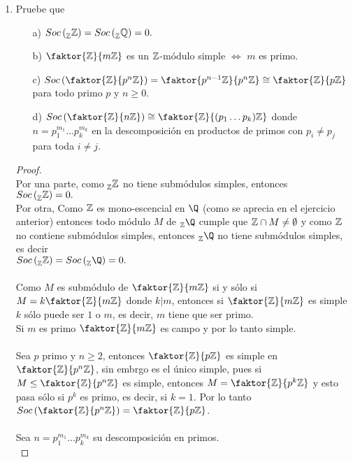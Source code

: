 \documentclass{article}
\begin{document}
\begin{enumerate}[label=\textbf{Ej \arabic*.}]
		\item Pruebe que 
		\begin{itemize}
			\item[a)] $Soc\left(\prescript{}{\mathbb{Z}}{\mathbb{Z}}\right)=Soc\left(\prescript{}{\mathbb{Z}}{\mathbb{Q}}\right)=0.$
			\item[b)] $\faktor{\Z}{m\Z}$ es un $\mathbb{Z}$-módulo simple $\iff$ $m$ es primo.
			\item[c)] $Soc\left(\faktor{\Z}{p^n\Z}\right)=\faktor{p^{n-1}\Z}{p^n\Z}\cong \faktor{\Z}{p\Z}$ para todo primo $p$ y $n\geq 0$.
			\item[d)] $Soc\left(\faktor{\Z}{n\Z}\right)\cong \faktor{\Z}{(p_1\ldots p_k)\Z}$ donde $n=p_1^{m_1}\ldots p_k^{m_k}$ en la descomposición
			en productos de primos con $p_i\neq p_j$ para toda $i\neq j$.
		\end{itemize}
		\begin{proof}\\
		Por una parte, como $\prescript{}{\mathbb{Z}}{\mathbb{Z}}$ no tiene submódulos simples, entonces\\ $Soc\left(\prescript{}{\mathbb{Z}}{\mathbb{Z}}\right)=0.$\\
		Por otra, Como $\mathbb{Z}$ es mono-escencial en $\Q$ (como se aprecia en el ejercicio anterior) entonces todo módulo $M$ de 
		$\prescript{}{\Z}{\Q}$ cumple que $\mathbb{Z}\cap M\neq \emptyset$ y como $\mathbb{Z}$ no contiene submódulos simples, entonces $\prescript{}{\Z}{\Q}$ no tiene
		submódulos simples, es decir \\$Soc\left(\prescript{}{\Z}{\Z}\right)=Soc\left(\prescript{}{\Z}{\Q}\right)=0.$\\
		\\
		Como $M$ es submódulo de  $\faktor{\Z}{m\Z}$ si y sólo si $M=k\faktor{\Z}{m\Z}$ donde $k|m$, entonces si $\faktor{\Z}{m\Z}$ es simple
		$k$ sólo puede ser $1$ o $m$, es decir, $m$ tiene que ser primo.\\
		Si $m$ es primo $\faktor{\Z}{m\Z}$ es campo y por lo tanto simple.\\
		\\
		Sea $p$ primo y $n\geq 2$, entonces $\faktor{\Z}{p\Z}$ es simple en $\faktor{\Z}{p^n\Z}$, sin embrgo es el único simple, pues
		si $M\leq \faktor{\Z}{p^n\Z}$ es simple, entonces $M=\faktor{\Z}{p^k\Z}$ y esto pasa sólo si $p^k$  es primo, es decir, si $k=1$.
		Por lo tanto \\$Soc\left(\faktor{\Z}{p^n\Z}\right)=\faktor{\Z}{p\Z}$.\\
		\\
		Sea $n=p_1^{m_1}\ldots p_k^{m_k}$ su descomposición en primos.\\

\end{proof}
\end{enumerate}
\end{document}
